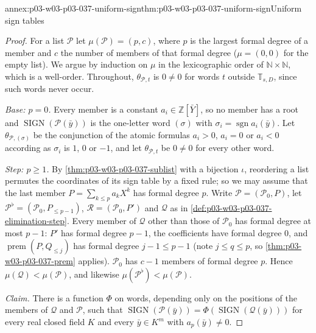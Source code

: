 \begin{annexitem}{annex:p03-w03-p03-037-uniform-sign}{thm:p03-w03-p03-037-uniform-sign}{Uniform sign tables}
\begin{proof}
For a list \(\mathcal P\) let \(\mu(\mathcal P)=(p,c)\), where \(p\) is the
largest formal degree of a member and \(c\) the number of members of that
formal degree (\(\mu=(0,0)\) for the empty list).  We argue by induction on
\(\mu\) in the lexicographic order of \(\mathbb N\times\mathbb N\), which is
a well-order.  Throughout, \(\theta_{\mathcal P,t}\) is \(0\neq0\) for words
\(t\) outside \(\mathbb T_{s,D}\), since such words never occur.

\emph{Base: \(p=0\).}  Every member is a constant \(a_i\in\mathbb Z[\bar Y]\),
so no member has a root and \(\operatorname{SIGN}(\mathcal P(\bar y))\) is
the one-letter word \((\sigma)\) with
\(\sigma_i=\operatorname{sgn}a_i(\bar y)\).  Let \(\theta_{\mathcal P,(\sigma)}\)
be the conjunction of the atomic formulas \(a_i>0\), \(a_i=0\) or
\(a_i<0\) according as \(\sigma_i\) is \(1\), \(0\) or \(-1\), and let
\(\theta_{\mathcal P,t}\) be \(0\neq0\) for every other word.

\emph{Step: \(p\geq1\).}  By \cref{thm:p03-w03-p03-037-sublist} with a
bijection \(\iota\), reordering a list permutes the coordinates of its sign
table by a fixed rule; so we may assume that the last member
\(P=\sum_{k\leq p}a_kX^k\) has formal degree \(p\).  Write
\(\mathcal P=(\mathcal P_0,P)\), let \(\mathcal P^\flat=(\mathcal P_0,P_{\leq p-1})\),
\(\mathcal R=(\mathcal P_0,P')\) and \(\mathcal Q\) as in
\cref{def:p03-w03-p03-037-elimination-step}.  Every member of
\(\mathcal Q\) other than those of \(\mathcal P_0\) has formal degree at most
\(p-1\): \(P'\) has formal degree \(p-1\), the coefficients have formal degree
\(0\), and \(\operatorname{prem}(P,Q_{\leq j})\) has formal degree \(j-1\leq p-1\)
(note \(j\leq q\leq p\), so \cref{thm:p03-w03-p03-037-prem} applies).
\(\mathcal P_0\) has \(c-1\) members of formal degree \(p\).  Hence
\(\mu(\mathcal Q)<\mu(\mathcal P)\), and likewise
\(\mu(\mathcal P^\flat)<\mu(\mathcal P)\).

\emph{Claim.}  There is a function \(\Phi\) on words, depending only on the
positions of the members of \(\mathcal Q\) and \(\mathcal P\), such that
\(\operatorname{SIGN}(\mathcal P(\bar y))=\Phi(\operatorname{SIGN}(\mathcal Q(\bar y)))\)
for every real closed field \(K\) and every \(\bar y\in K^m\) with
\(a_p(\bar y)\neq0\).


\end{proof}
\end{annexitem}
